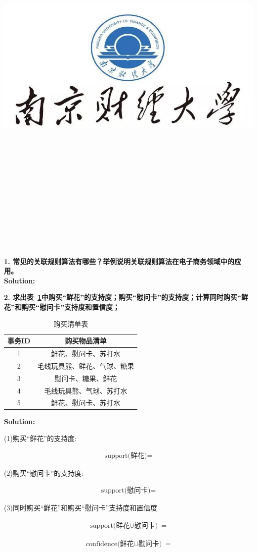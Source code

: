 \documentclass{article}
\title{
	\includegraphics[scale = 0.45]{images/title/ucas-logo1.png}\\
    \vspace{1in}
    \textmd{\textbf{\hmwkClass\ \hmwkTitle}}\\
    \textmd{\textbf{\hmwkSubTitle}}\\
    \normalsize\vspace{0.1in}\small{\hmwkCompleteTime }\\
    \vspace{0.1in}\large{\textit{\hmwkClassInstructor\ }}\\
    \vspace{3in}
}
\author{\hmwkAuthorName \\ 
	\hmwkAuthorStuID}
\date{}
\begin{document}
\maketitle


%


\pagebreak

\begin{homeworkProblem}
\textbf{1.	常见的关联规则算法有哪些？举例说明关联规则算法在电子商务领域中的应用。}\\
	\textbf{Solution:}\\
	{\color{blue}	
  
    }
\end{homeworkProblem}
\pagebreak

\begin{homeworkProblem}
	\textbf{2. 求出表~\ref{coldstartuser}中购买“鲜花”的支持度；购买“慰问卡”的支持度；计算同时购买“鲜花”和购买“慰问卡”支持度和置信度；
	}\\
	\begin{table}[htbp!]
		\centering
		\caption{购买清单表}
		\label{coldstartuser}
		\begin{tabular}{c|c}
			\hline
			事务ID & 购买物品清单   \\
			\hline
			1   & 鲜花、慰问卡、苏打水    \\
			2  & 毛线玩具熊、鲜花、气球、糖果 \\
			3  & 慰问卡、糖果、鲜花     \\
			4 & 毛线玩具熊、气球、苏打水	 \\
			5 &  鲜花、慰问卡、苏打水 \\
			\hline
		\end{tabular}%
	\end{table}
	\textbf{Solution:}\\
	{\color{blue}	
	(1)购买“鲜花”的支持度:     \\
	\begin{center}
		\begin{eqnarray}
        \text{support(鲜花)}=
		\end{eqnarray}
	\end{center}
	(2)购买“慰问卡”的支持度:         \\
		\begin{center}
		\begin{eqnarray}
			\text{support(慰问卡)}=
		\end{eqnarray}
	\end{center}
	(3)同时购买“鲜花”和购买“慰问卡”支持度和置信度 \\
			\begin{center}
		\begin{eqnarray}
			\text{support(鲜花$\cup$慰问卡)}=
		\end{eqnarray}
	\end{center}
    
			\begin{center}
	\begin{eqnarray}
		\text{confidence(鲜花$\cup$慰问卡)}=
	\end{eqnarray}
\end{center}
}
	
\end{homeworkProblem}
\end{document}
